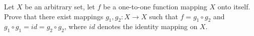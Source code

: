 \documentclass{article}
\begin{document}
\setlength{\parindent}{0pt}
Let $X$ be an arbitrary set, let $f$ be a one-to-one function mapping $X$ onto itself.
Prove that there exist mappings $g_1,g_2:X\to X$ such that $f=g_1\circ g_2$ and $g_1 \circ g_1=id=g_2\circ g_2$, where $id$ denotes the identity mapping on $X$.
\end{document}
